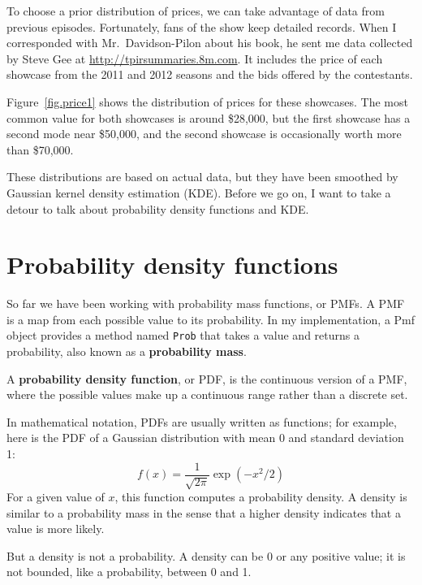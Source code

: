 \documentclass[12pt]{book}
\theoremstyle{exercise}
\begin{document}
To choose a prior distribution of prices, we can take advantage
of data from previous episodes.  Fortunately, fans of the show
keep detailed records.  When I corresponded with Mr.~Davidson-Pilon
about his book, he sent me data collected by Steve Gee at
\url{http://tpirsummaries.8m.com}.  It includes the price of
each showcase from the 2011 and 2012 seasons and the bids
offered by the contestants.

Figure~\ref{fig.price1} shows the distribution of prices for these
showcases.  The most common value for both showcases is around
\$28,000, but the first showcase has a second mode near \$50,000,
and the second showcase is occasionally worth more than \$70,000.

These distributions are based on actual data, but they
have been smoothed by Gaussian kernel density estimation (KDE).
Before we go on, I want to take a detour to talk about 
probability density functions and KDE.


\section{Probability density functions}

So far we have been working with probability mass functions, or PMFs.
A PMF is a map from each possible value to its probability.  In my
implementation, a Pmf object provides a method named {\tt Prob} that
takes a value and returns a probability, also known as a {\bf probability
mass}.

A {\bf probability density function}, or PDF, is the continuous version of a
PMF, where the possible values make up a continuous range rather than
a discrete set.  

In mathematical notation, PDFs are usually written as functions; for
example, here is the PDF of a Gaussian distribution with
mean 0 and standard deviation 1:
%
\[ f(x) = \frac{1}{\sqrt{2 \pi}} \exp(-x^2/2) \]
%
For a given value of $x$, this function computes a probability
density.  
A density is similar
to a probability mass in the sense that a higher density indicates
that a value is more likely.

But a density is not a probability.  A density can be 0 or any positive
value; it is not bounded, like a probability, between 0 and 1.
\end{document}
